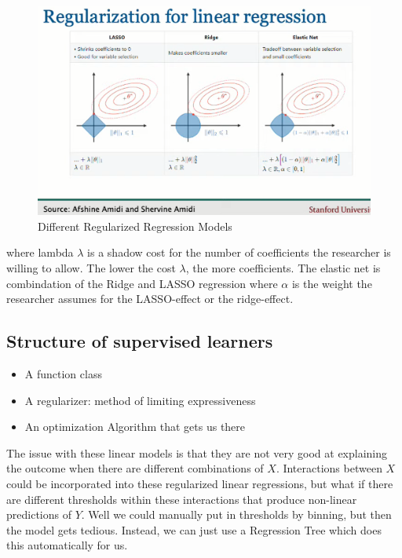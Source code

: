 \documentclass{article}
\begin{document}
\begin{figure}[H]
    \centering
    \includegraphics[scale=0.3]{reg_lin.png}
    \caption{Different Regularized Regression Models}
    \label{fig:reg_lin}
\end{figure}

where lambda $\lambda$ is a shadow cost for the number of coefficients the researcher is willing to allow. The lower the cost $\lambda$, the more coefficients. The elastic net is combindation of the Ridge and LASSO regression where $\alpha$ is the weight the researcher assumes for the LASSO-effect or the ridge-effect.

\subsection{Structure of supervised learners}

\begin{itemize}
    \item A function class
    \item A regularizer: method of limiting expressiveness
    \item An optimization Algorithm that gets us there
\end{itemize}

The issue with these linear models is that they are not very good at explaining the outcome when there are different combinations of $X$. Interactions between $X$ could be incorporated into these regularized linear regressions, but what if there are different thresholds within these interactions that produce non-linear predictions of $Y$. Well we could manually put in thresholds by binning, but then the model gets tedious. Instead, we can just use a Regression Tree which does this automatically for us. 
\end{document}
